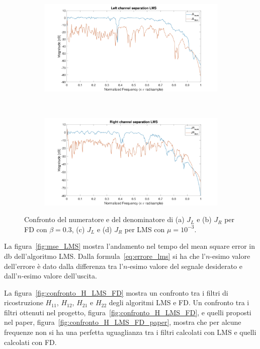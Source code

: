 \documentclass[12pt,a4paper,titlepage]{article}
\begin{document}
\begin{figure}[h]
	\ContinuedFloat
	\centering	
	\begin{subfigure}{1\textwidth}
		\includegraphics[width=1\textwidth]{Immagini/left_channel_separation_LMS}
		\caption{}
		\label{left_channel_separation_LMS}
	\end{subfigure}\\
	\begin{subfigure}{1\textwidth}
		\includegraphics[width=1\textwidth]{Immagini/right_channel_separation_LMS}
		\caption{}
		\label{right_channel_separation_LMS}
	\end{subfigure}
	\caption{Confronto del numeratore e del denominatore di (a) $J_L$ e (b) $J_R$ per FD con $\beta = 0.3$, (c) $J_L$ e (d) $J_R$ per LMS con $\mu = 10^{-3}$.}
	\label{fig:channel_separation_LMS_FD}
\end{figure}

La figura~\ref{fig:mse_LMS} mostra l'andamento nel tempo del mean square error in \si{\decibel} dell'algoritmo LMS. Dalla formula~\eqref{eq:errore_lms} si ha che l'$n$-esimo valore dell'errore è dato dalla differenza tra l'$n$-esimo valore del segnale desiderato e dall'$n$-esimo valore dell'uscita. 

La figura~\ref{fig:confronto_H_LMS_FD} mostra un confronto tra i filtri di ricostruzione $H_{11}$, $H_{12}$, $H_{21}$ e $H_{22}$ degli algoritmi LMS e FD. Un confronto tra i filtri ottenuti nel progetto, figura~\ref{fig:confronto_H_LMS_FD}, e quelli proposti nel paper, figura~\ref{fig:confronto_H_LMS_FD_paper}, mostra che per alcune frequenze non si ha una perfetta uguaglianza tra i filtri calcolati con LMS e quelli calcolati con FD.
\end{document}
